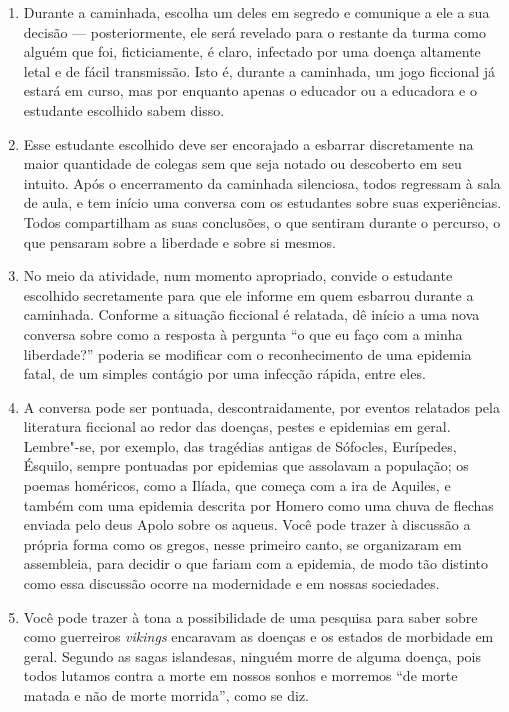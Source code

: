 \documentclass[12pt]{extarticle}
\begin{document}
\begin{enumerate}
\item Durante a caminhada, escolha um deles em segredo e comunique a ele a sua
decisão --- posteriormente, ele será revelado para o restante da turma
como alguém que foi, ficticiamente, é claro, infectado por uma doença
altamente letal e de fácil transmissão. Isto é, durante a caminhada, um
jogo ficcional já estará em curso, mas por enquanto apenas o educador ou
a educadora e o estudante escolhido sabem disso.

\item Esse estudante escolhido deve ser encorajado a esbarrar discretamente na
maior quantidade de colegas sem que seja notado ou descoberto em seu
intuito. Após o encerramento da caminhada silenciosa, todos regressam à
sala de aula, e tem início uma conversa com os estudantes sobre suas
experiências. Todos compartilham as suas conclusões, o que sentiram
durante o percurso, o que pensaram sobre a liberdade e sobre si mesmos.

\item No meio da atividade, num momento apropriado, convide o estudante
escolhido secretamente para que ele informe em quem esbarrou durante a
caminhada. Conforme a situação ficcional é relatada, dê início a uma
nova conversa sobre como a resposta à pergunta ``o que eu faço com a
minha liberdade?'' poderia se modificar com o reconhecimento de uma
epidemia fatal, de um simples contágio por uma infecção rápida, entre
eles.

\item A conversa pode ser pontuada, descontraidamente, por eventos relatados
pela literatura ficcional ao redor das doenças, pestes e epidemias em
geral. Lembre"-se, por exemplo, das tragédias antigas de Sófocles,
Eurípedes, Ésquilo, sempre pontuadas por epidemias que assolavam a
população; os poemas homéricos, como a Ilíada, que começa com a ira de
Aquiles, e também com uma epidemia descrita por Homero como uma chuva de
flechas enviada pelo deus Apolo sobre os aqueus. Você pode trazer à
discussão a própria forma como os gregos, nesse primeiro canto, se
organizaram em assembleia, para decidir o que fariam com a epidemia, de
modo tão distinto como essa discussão ocorre na modernidade e em nossas
sociedades.

\item Você pode trazer à tona a possibilidade de uma pesquisa para saber sobre
como guerreiros \emph{vikings} encaravam as doenças e os estados de morbidade
em geral. Segundo as sagas islandesas, ninguém morre de alguma doença,
pois todos lutamos contra a morte em nossos sonhos e morremos ``de morte
matada e não de morte morrida'', como se diz.


\end{enumerate}
\end{document}
